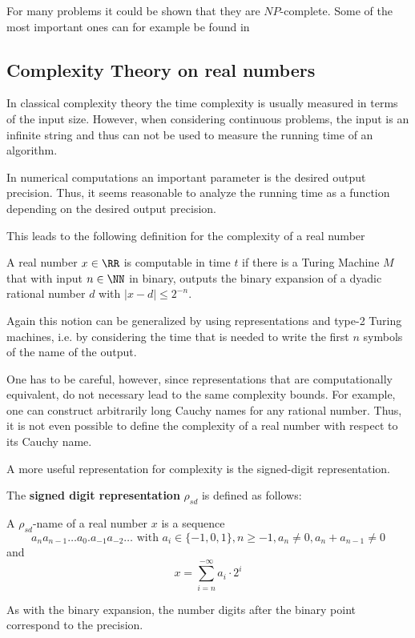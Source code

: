     For many problems it could be shown that they are $NP$-complete. 
    Some of the most important ones can for example be found in
    \cite{garey1979}
	\subsection{Complexity Theory on real numbers}
		In classical complexity theory the time complexity is usually measured in terms of the input size.
		However, when considering continuous problems, the input is an infinite string and thus can not 
		be used to measure the running time of an algorithm.

		In numerical computations an important parameter is the desired output precision.
		Thus, it seems reasonable to analyze the running time as a function depending on the desired output precision.
    
		This leads to the following definition for the complexity of a real
    number
		\begin{definition}\label{def:complexity_real_number}
			A real number $x \in \RR$ is computable in time $t$ if there is a Turing Machine $M$ that with input $n \in \NN$ in binary, 
			outputs the binary expansion of a dyadic rational number $d$ with $| x - d | \leq 2^{-n}$.  
		\end{definition}
		Again this notion can be generalized by using representations and type-2
    Turing machines, i.e. by considering the time that is needed to write the first $n$ symbols
		of the name of the output.
      
    One has to be careful, however, since representations that are
    computationally equivalent, do not necessary lead to the same complexity
    bounds.  
    For example, one can construct arbitrarily long Cauchy names for
    any rational number.
    Thus, it is not even possible to define the complexity of a real number
    with respect to its Cauchy name.

		A more useful representation for complexity is the signed-digit
    representation.
		\begin{definition}
			The \textbf{signed digit representation} $\rho_{sd}$ is defined as follows: 

      A $\rho_{sd}$-name of a real number $x$ is a sequence 
			$$a_n a_{n-1} \dots a_0 . a_{-1} a_{-2} \dots \text{ with } a_i \in \{-1,0,1\}, n \geq -1, a_n \neq 0, a_n + a_{n-1} \neq 0$$
      and
			$$  x = \sum_{i=n}^{-\infty} a_i \cdot 2^i $$  
		\end{definition}
		As with the binary expansion, the number digits after the binary point correspond to the precision.

